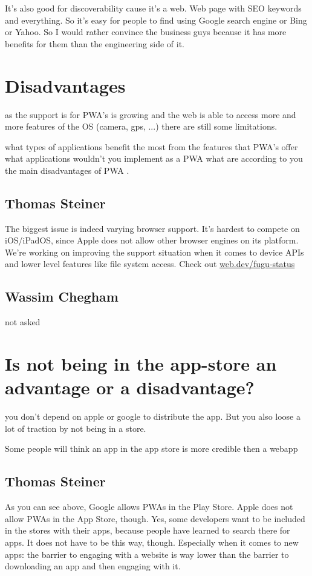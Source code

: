 			It's also good for discoverability cause it's a web. Web page with SEO keywords and everything. So it's easy for people to find using Google search engine or Bing or Yahoo. So I would rather convince the business guys because it has more benefits for them than the engineering side of it.
			
	\section{Disadvantages}
	
		as the support is for PWA's is growing and the web is able to access more and more features of the OS (camera, gps, ...) there are still some limitations. 
		
		what types of applications benefit the most from the features that PWA's offer what applications wouldn't you implement as a PWA what are according to you the main disadvantages of PWA .
		
		\subsection{Thomas Steiner}
		
			The biggest issue is indeed varying browser support. It’s hardest to compete on iOS/iPadOS, since Apple does not allow other browser engines on its platform. We’re working on improving the support situation when it comes to device APIs and lower level features like file system access. Check out	\href{https://web.dev/fugu-status/}{web.dev/fugu-status}

		\subsection{Wassim Chegham}
			not asked
			


	\section{Is not being in the app-store an advantage or a disadvantage?}
		
		you don't depend on apple or google to distribute the app. But you also loose a lot of traction by not being in a store.
		
		Some people will think an app in the app store is more credible then a webapp
			
		\subsection{Thomas Steiner}
			As you can see above, Google allows PWAs in the Play Store. Apple does not allow PWAs in the App Store, though. Yes, some developers want to be included in the stores with their apps, because people have learned to search there for apps. It does not have to be this way, though. Especially when it comes to new apps: the barrier to engaging with a website is way lower than the barrier to downloading an app and then engaging with it.
			
